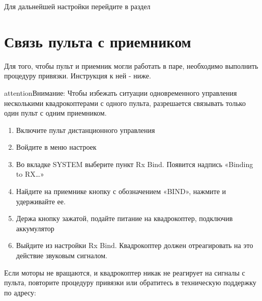 \documentclass[a4paper,10pt,russian]{sphinxmanual}
\begin{document}
Для дальнейшей настройки перейдите в раздел {\hyperref[\detokenize{settings/rc_connection::doc}]{}}


\section{Связь пульта с приемником}
\label{\detokenize{settings/rc_connection:id1}}\label{\detokenize{settings/rc_connection::doc}}
Для того, чтобы пульт и приемник могли работать в паре, необходимо выполнить процедуру привязки. Инструкция к ней - ниже.

\begin{sphinxadmonition}{attention}{Внимание:}
Чтобы избежать ситуации одновременного управления несколькими квадрокоптерами с одного пульта, разрешается связывать только один пульт с одним приемником.
\end{sphinxadmonition}

\begin{enumerate}
\def\theenumi{\arabic{enumi}}
\def\labelenumi{\theenumi .}
\makeatletter\def\p@enumii{\p@enumi \theenumi .}\makeatother
\item {} 
Включите пульт дистанционного управления

\item {} 
Войдите в меню настроек

\item {} 
Во вкладке SYSTEM выберите пункт Rx Bind. Появится надпись «Binding to RX…»

\item {} 
Найдите на приемнике кнопку с обозначением «BIND», нажмите и удерживайте ее.

\item {} 
Держа кнопку зажатой, подайте питание на квадрокоптер, подключив аккумулятор

\item {} 
Выйдите из настройки Rx Bind. Квадрокоптер должен отреагировать на это действие звуковым сигналом.

\end{enumerate}

Если моторы не вращаются, и квадрокоптер никак не реагирует на сигналы с пульта, повторите процедуру привязки или обратитесь в техническую поддержку по адресу: 
\end{document}
